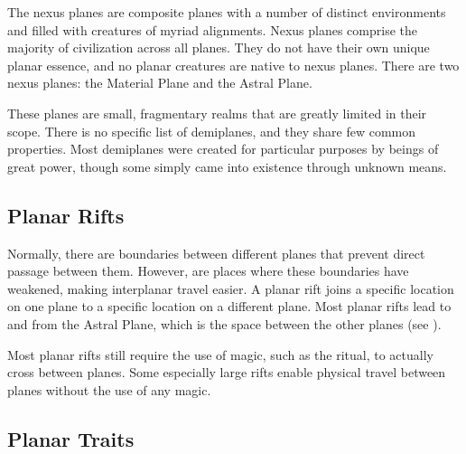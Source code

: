          The nexus planes are composite planes with a number of distinct environments and filled with creatures of myriad alignments.
        Nexus planes comprise the majority of civilization across all planes.
        They do not have their own unique planar essence, and no planar creatures are native to nexus planes.
        There are two nexus planes: the Material Plane and the Astral Plane.

         These planes are small, fragmentary realms that are greatly limited in their scope.
        There is no specific list of demiplanes, and they share few common properties.
        Most demiplanes were created for particular purposes by beings of great power, though some simply came into existence through unknown means.

    \subsection{Planar Rifts}\label{Planar Rifts}
        Normally, there are boundaries between different planes that prevent direct passage between them.
        However,  are places where these boundaries have weakened, making interplanar travel easier.
        A planar rift joins a specific location on one plane to a specific location on a different plane.
        Most planar rifts lead to and from the Astral Plane, which is the space between the other planes (see ).

        Most planar rifts still require the use of magic, such as the  ritual, to actually cross between planes.
        Some especially large rifts enable physical travel between planes without the use of any magic.

    \subsection{Planar Traits}
